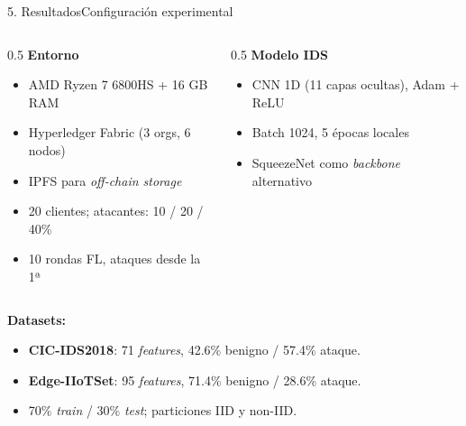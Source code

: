 \begin{frame}{5. Resultados}{Configuración experimental}
  \begin{columns}[T]
    \begin{column}{0.5\textwidth}
      \textbf{Entorno}\\[0.2em]
      \begin{itemize}\small
        \item AMD Ryzen 7 6800HS + 16 GB RAM
        \item Hyperledger Fabric (3 orgs, 6 nodos)
        \item IPFS para \textit{off-chain storage}
        \item 20 clientes; atacantes: 10 / 20 / 40\%
        \item 10 rondas FL, ataques desde la 1ª
      \end{itemize}
    \end{column}
    \begin{column}{0.5\textwidth}
      \textbf{Modelo IDS}\\[0.2em]
      \begin{itemize}\small
        \item CNN 1D (11 capas ocultas), Adam + ReLU
        \item Batch 1024, 5 épocas locales
        \item SqueezeNet como \textit{backbone} alternativo
      \end{itemize}
    \end{column}
  \end{columns}
  \vfill
  \textbf{Datasets:}
  \begin{itemize}\small
    \item \textbf{CIC-IDS2018}: 71 \textit{features}, 42.6\% benigno / 57.4\% ataque.
    \item \textbf{Edge-IIoTSet}: 95 \textit{features}, 71.4\% benigno / 28.6\% ataque.
    \item 70\% \textit{train} / 30\% \textit{test}; particiones IID y non-IID.
  \end{itemize}
\end{frame}

